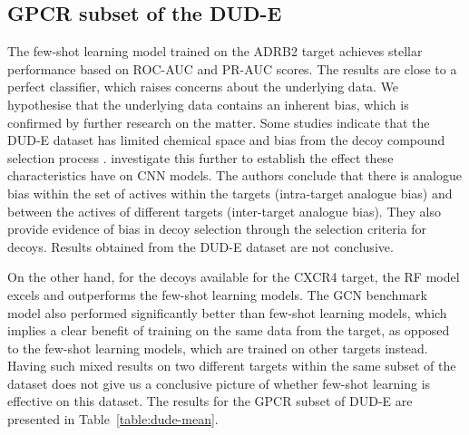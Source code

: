 \subsection{GPCR subset of the DUD-E}

The few-shot learning model trained on the ADRB2 target achieves stellar performance based on ROC-AUC and PR-AUC scores. The results are close to a perfect classifier, which raises concerns about the underlying data. We hypothesise that the underlying data contains an inherent bias, which is confirmed by further research on the matter. Some studies indicate that the DUD-E dataset has limited chemical space and bias from the decoy compound selection process \cite{smusz2013influence, wallach2018most}. \citet{chen2019hidden} investigate this further to establish the effect these characteristics have on CNN models. The authors conclude that there is analogue bias within the set of actives within the targets (intra-target analogue bias) and between the actives of different targets (inter-target analogue bias). They also provide evidence of bias in decoy selection through the selection criteria for decoys. Results obtained from the DUD-E dataset are not conclusive.

On the other hand, for the decoys available for the CXCR4 target, the RF model excels and outperforms the few-shot learning models. The GCN benchmark model also performed significantly better than few-shot learning models, which implies a clear benefit of training on the same data from the target, as opposed to the few-shot learning models, which are trained on other targets instead. Having such mixed results on two different targets within the same subset of the dataset does not give us a conclusive picture of whether few-shot learning is effective on this dataset. The results for the GPCR subset of DUD-E are presented in Table~\ref{table:dude-mean}.

